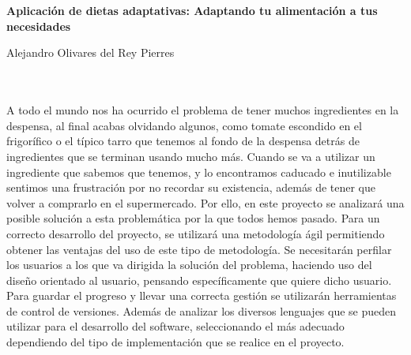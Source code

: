 \chapter*{}


\cleardoublepage
\thispagestyle{empty}

\begin{center}
{\large\bfseries Aplicación de dietas adaptativas: Adaptando tu alimentación a tus necesidades}\\
\end{center}
\begin{center}
Alejandro Olivares del Rey Pierres\\
\end{center}

\\

\vspace{0.7cm}
\\

A todo el mundo nos ha ocurrido el problema de tener muchos ingredientes en la despensa, al final acabas olvidando algunos, como tomate escondido en el frigorífico o el típico tarro que tenemos al fondo de la despensa detrás de ingredientes que se terminan usando mucho más. Cuando se va a utilizar un ingrediente que sabemos que tenemos, y lo encontramos caducado e inutilizable sentimos una frustración por no recordar su existencia, además de tener que volver a comprarlo en el supermercado. Por ello, en este proyecto se analizará una posible solución a esta problemática por la que todos hemos pasado. Para un correcto desarrollo del proyecto, se utilizará una metodología ágil permitiendo obtener las ventajas del uso de este tipo de metodología. Se necesitarán perfilar los usuarios a los que va dirigida la solución del problema, haciendo uso del diseño orientado al usuario, pensando específicamente que quiere dicho usuario. Para guardar el progreso y llevar una correcta gestión se utilizarán herramientas de control de versiones. Además de analizar los diversos lenguajes que se pueden utilizar para el desarrollo del software, seleccionando el más adecuado dependiendo del tipo de implementación que se realice en el proyecto. 

